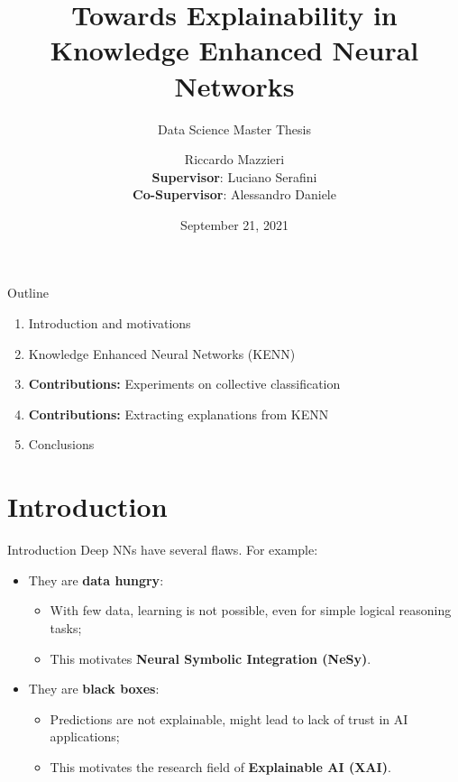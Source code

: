 \documentclass{beamer}
\title{Towards Explainability in Knowledge Enhanced Neural Networks}
\subtitle{Data Science Master Thesis}
\author{Riccardo Mazzieri \\ \vspace{10pt}
\textbf{Supervisor}: Luciano Serafini\\
\textbf{Co-Supervisor}: Alessandro Daniele \vspace{10pt}}
\date{September 21, 2021}
\begin{document}
	\maketitle

	\begin{frame}{Outline}
\begin{enumerate}
	\item Introduction and motivations \vspace{12pt}
	\item Knowledge Enhanced Neural Networks (KENN) \vspace{12pt}
	\item \textcolor{unipd}{\textbf{Contributions:} Experiments on collective classification} \vspace{12pt}
	\item \textcolor{unipd}{\textbf{Contributions:} Extracting explanations from KENN} \vspace{12pt}
	\item Conclusions
\end{enumerate}
	\end{frame}


	\section{Introduction}

	\begin{frame}{Introduction}
		Deep NNs have several flaws. For example:
		\begin{itemize}
			\item They are \textbf{data hungry}:
			\begin{itemize}
				\item With few data, learning is not possible, even for simple logical reasoning tasks;
				\item This motivates \textbf{Neural Symbolic Integration (NeSy)}.
				\pause
			\end{itemize}
			\item They are \textbf{black boxes}:
			\begin{itemize}
				\item Predictions are not explainable, might lead to lack of trust in AI applications;
				\item This motivates the research field of \textbf{Explainable AI (XAI)}.
			\end{itemize}
		\end{itemize}
	\end{frame}
\end{document}
